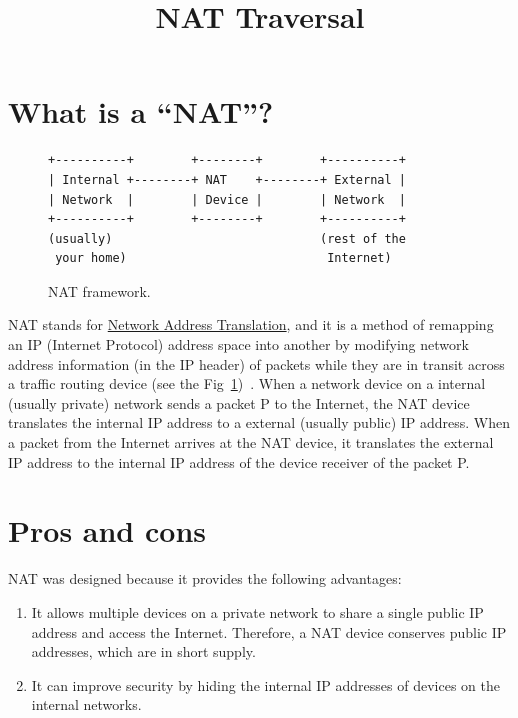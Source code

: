
\title{NAT Traversal}

\maketitle
\tableofcontents

\section{What is a ``NAT''?}

\begin{figure}
\begin{verbatim}
+----------+        +--------+        +----------+
| Internal +--------+ NAT    +--------+ External |
| Network  |        | Device |        | Network  |
+----------+        +--------+        +----------+
(usually)                             (rest of the
 your home)                            Internet)
\end{verbatim}
\caption{NAT framework.}
\label{fig:NAT_framework}
\end{figure}

NAT stands for
\href{https://en.wikipedia.org/wiki/Network_address_translation}{Network
  Address Translation}, and it is a method of remapping an IP
(Internet Protocol) address space into another by modifying network
address information (in the IP header) of packets while they are in
transit across a traffic routing device (see the
Fig~\ref{fig:NAT_framework})~\cite{srisuresh1999nat,Srisuresh2001}. When
a network device on a internal (usually private) network sends a
packet P to the Internet, the NAT device translates the internal IP
address to a external (usually public) IP address. When a packet from
the Internet arrives at the NAT device, it translates the external IP
address to the internal IP address of the device receiver of the
packet P.

\section{Pros and cons}

NAT was designed because it provides the following advantages:
\begin{enumerate}
\item It allows multiple devices on a private network to share a
  single public IP address and access the Internet. Therefore, a NAT
  device conserves public IP addresses, which are in short supply.
\item It can improve security by hiding the internal IP addresses of
  devices on the internal networks.
\end{enumerate}

